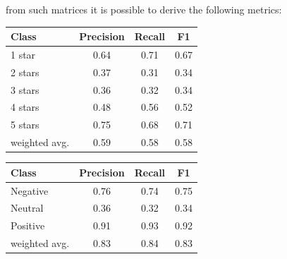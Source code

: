             from such matrices it is possible to derive the following metrics:

            \begin{table}[H]
                \centering
                \begin{minipage}{0.48\textwidth}
                    \centering
                    \begin{tabular}{l c c c}
                        \toprule
                        \textbf{Class} & \textbf{Precision} & \textbf{Recall} & \textbf{F1} \\                  
                        \midrule
                        1 star & 0.64 & 0.71 & 0.67 \\
                        2 stars & 0.37 & 0.31 & 0.34 \\
                        3 stars & 0.36 & 0.32 & 0.34 \\
                        4 stars & 0.48 & 0.56 & 0.52 \\
                        5 stars & 0.75 & 0.68 & 0.71 \\
                        \midrule
                        weighted avg. & 0.59 & 0.58 & 0.58 \\
                        \bottomrule
                    \end{tabular}
                    \label{tab:5-class_lstm_metrics}
                \end{minipage}\hfill
                \begin{minipage}{0.48\textwidth}
                    \centering
                    \begin{tabular}{l c c c}
                        \toprule
                        \textbf{Class} & \textbf{Precision} & \textbf{Recall} & \textbf{F1} \\                  
                        \midrule
                        Negative & 0.76 & 0.74 & 0.75 \\
                        Neutral & 0.36 & 0.32 & 0.34 \\
                        Positive & 0.91 & 0.93 & 0.92 \\
                        \midrule
                        weighted avg. & 0.83 & 0.84 & 0.83 \\
                        \bottomrule
                    \end{tabular}
                    \label{tab:3-class_lstm_metrics}
                \end{minipage}\hfill
            \end{table}

